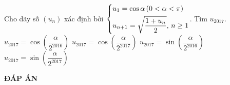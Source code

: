 \begin{ex}%
	Cho dãy số $(u_n)$ xác định bởi $\left\{\begin{aligned}&u_1=\cos\alpha \, (0<\alpha <\pi)\\&u_{n+1}=\sqrt{\dfrac{1+u_n}{2}}, \, n\geq 1\end{aligned}\right.$. Tìm $u_{2017}$.
	\choice
	{\True $u_{2017}=\cos\left(\dfrac{\alpha}{2^{2016}}\right)$}
	{$u_{2017}=\cos\left(\dfrac{\alpha}{2^{2017}}\right)$}
	{$u_{2017}=\sin\left(\dfrac{\alpha}{2^{2016}}\right)$}
	{$u_{2017}=\sin\left(\dfrac{\alpha}{2^{2017}}\right)$}
\end{ex}

\newpage
\begin{center}
	\textbf{ĐÁP ÁN}
\end{center}
\begin{multicols}{10}
	 
\end{multicols}


